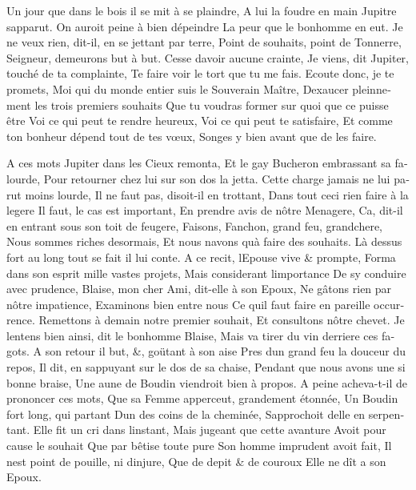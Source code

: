 \documentclass[14pt,a4paper]{memoir}
\begin{document}
\begin{otherlanguage}{french}
{Un jour que dans le bois il se mit à se plaindre, } {A lui la foudre en
main Jupitre s\textquotesingle apparut.} {On auroit peine à bien
dépeindre} {La peur que le bonhomme en eut.} {Je ne veux rien, dit-il,
en se jettant par terre, } {Point de souhaits, point de Tonnerre,}
{Seigneur, demeurons but à but.} {Cesse d\textquotesingle avoir aucune
crainte,} {Je viens, dit Jupiter, touché de ta complainte, } {Te faire
voir le tort que tu me fais.} {Ecoute donc, je te promets,} {Moi qui du
monde entier suis le Souverain Maître, } {D\textquotesingle exaucer
pleinnement les trois premiers souhaits } {Que tu voudras former sur
quoi que ce puisse être } {Voi ce qui peut te rendre heureux,} {Voi ce
qui peut te satisfaire,} {Et comme ton bonheur dépend tout de tes vœux,}
{Songes y bien avant que de les faire.}

{A ces mots Jupiter dans les Cieux remonta,} {Et le gay Bucheron
embrassant sa falourde,} {Pour retourner chez lui sur son dos la jetta.}
{Cette charge jamais ne lui parut moins lourde,} {Il ne faut pas,
disoit-il en trottant,} {Dans tout ceci rien faire à la legere} {Il
faut, le cas est important,} {En prendre avis de nôtre Menagere,}
{C\textquotesingle a, dit-il en entrant sous son toit de feugere, }
{Faisons, Fanchon, grand feu, grand\textquotesingle chere,} {Nous sommes
riches desormais,} {Et nous n\textquotesingle avons qu\textquotesingle à
faire des souhaits.} {Là dessus fort au long tout se fait il lui conte.
} {A ce recit, l\textquotesingle Epouse vive \& prompte,} {Forma dans
son esprit mille vastes projets,} {Mais considerant
l\textquotesingle importance} {De s\textquotesingle y conduire avec
prudence,} {Blaise, mon cher Ami, dit-elle à son Epoux,} {Ne gâtons rien
par nôtre impatience,} {Examinons bien entre nous} {Ce
qu\textquotesingle il faut faire en pareille occurrence.} {Remettons à
demain notre premier souhait,} {Et consultons nôtre chevet.} {Je
l\textquotesingle entens bien ainsi, dit le bonhomme Blaise, } {Mais va
tirer du vin derriere ces fagots.} {A son retour il but, \&, goütant à
son aise} {Pres d\textquotesingle un grand feu la douceur du repos,} {Il
dit, en s\textquotesingle appuyant sur le dos de sa chaise,} {Pendant
que nous avons une si bonne braise,} {Une aune de Boudin viendroit bien
à propos.} {A peine acheva-t-il de prononcer ces mots,} {Que sa Femme
apperceut, grandement étonnée,} {Un Boudin fort long, qui partant}
{D\textquotesingle un des coins de la cheminée,}
{S\textquotesingle approchoit d\textquotesingle elle en serpentant.}
{Elle fit un cri dans l\textquotesingle instant,} {Mais jugeant que
cette avanture} {Avoit pour cause le souhait} {Que par bêtise toute
pure} {Son homme imprudent avoit fait,} {Il n\textquotesingle est point
de pouille, ni d\textquotesingle injure,} {Que de depit \& de couroux}
{Elle ne dît a son Epoux.}


\end{otherlanguage}
\end{document}
